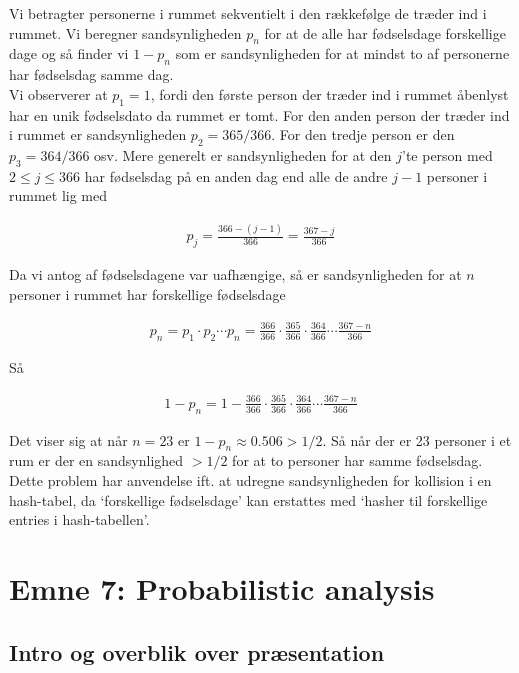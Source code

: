 \documentclass[12pt]{article}
\begin{document}
Vi betragter personerne i rummet sekventielt i den rækkefølge de træder ind i rummet. Vi beregner sandsynligheden $p_n$ for at de alle har fødselsdage forskellige dage og så finder vi $1-p_n$ som er sandsynligheden for at mindst to af personerne har fødselsdag samme dag. \\

Vi observerer at $p_1=1$, fordi den første person der træder ind i rummet åbenlyst har en unik fødselsdato da rummet er tomt. For den anden person der træder ind i rummet er sandsynligheden $p_2 = 365/366$. For den tredje person er den $p_3=364/366$ osv. Mere generelt er sandsynligheden for at den $j$'te person med $2 \le j \le 366$ har fødselsdag på en anden dag end alle de andre $j-1$ personer i rummet lig med 

\begin{align*}
    p_{j}=\frac{366-(j-1)}{366} = \frac{367-j}{366}
\end{align*}

Da vi antog af fødselsdagene var uafhængige, så er sandsynligheden for at $n$ personer i rummet har forskellige fødselsdage

\begin{align*}
    p_n=p_1 \cdot p_2 \cdots p_n=\frac{366}{366} \cdot \frac{365}{366} \cdot \frac{364}{366} \cdots \frac{367-n}{366}  
\end{align*}

Så

\begin{align*}
    1-p_n=1-\frac{366}{366} \cdot \frac{365}{366} \cdot \frac{364}{366} \cdots \frac{367-n}{366} 
\end{align*}

Det viser sig at når $n=23$ er $1-p_n \approx 0.506 > 1/2$. Så når der er 23 personer i et rum er der en sandsynlighed $>1/2$ for at to personer har samme fødselsdag. \\

Dette problem har anvendelse ift. at udregne sandsynligheden for kollision i en hash-tabel, da `forskellige fødselsdage' kan erstattes med `hasher til forskellige entries i hash-tabellen'.

\newpage

\section{Emne 7: Probabilistic analysis}

\subsection*{Intro og overblik over præsentation}
\end{document}
